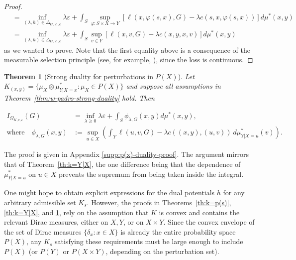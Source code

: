 \documentclass{article}
\newcommand{\Okc}{\Omega_{K, c, \varepsilon}}
\newcommand{\D}{\Delta_{G,\ell, c}}
\newcommand{\phifix}{\phi_{\lambda, G}}
\newtheorem{theorem}{Theorem}[section]
\theoremstyle{definition}
\theoremstyle{remarksty}
\begin{document}
\begin{proof}
\begin{align*}
        & = \inf_{(\lambda, h) \in \D} \lambda \varepsilon  + \int_S   \sup_{\varphi :S\times X  \rightarrow Y} [\ell(x,\varphi(s,x),G) - \lambda c(s,x,\varphi(s,x))] d\mu^*(x,y)\\
        & = \inf_{(\lambda, h) \in \D} \lambda \varepsilon  + \int_S   \sup_{v \in Y} [\ell(x,v,G) - \lambda c(x,y,x,v)] d\mu^*(x,y)
        \end{align*}
    as we wanted to prove. Note that the first equality above is a consequence of the measurable selection principle (see, for example, \cite[Theorem 3A]{rockafellar_integral_1976}), since the loss is continuous.
\end{proof}

\begin{theorem}[Strong duality for perturbations in $P(X)$]\label{th:k=x}
Let $K_{(x,y)} = \{\mu_X \otimes \mu^*_{Y|X = x} : \mu_X \in P(X)\}$ and suppose all assumptions in Theorem~\ref{thm:w-padro-strong-duality} hold. Then

    \begin{align*}
        I_{\Okc} (G) &= \inf_{\lambda \geq 0} \lambda \varepsilon +  \int_{S} \phifix(x,y) d\mu^*(x,y), \\
        \text{where} \quad \phifix (x,y)&:= \sup_{u \in X} \left(\int_Y \ell (u, v, G) - \lambda c((x,y),(u,v))\ d\mu_{Y|X=u}^*(v) \right).
    \end{align*}
\end{theorem}

The proof is given in Appendix \ref{supp:p(x)-duality-proof}. The argument mirrors that of Theorem~\ref{th:k=Y|X}, the one difference being that the dependence of $\mu_{Y|X=u}^*$ on $u\in X$ prevents the supremum from being taken inside the integral.

One might hope to obtain explicit expressions for the dual potentials $h$ for any arbitrary admissible set $K_s$. However, the proofs in Theorems~\ref{th:k=p(s)}, \ref{th:k=Y|X}, and \ref{th:k=x}, rely on the assumption that $K$ is convex and contains the relevant Dirac measures, either on $X, Y$, or on $X\times Y$. Since the convex envelope of the set of Dirac measures $\{\delta_x:x \in X\}$ is already the entire probability space $P(X)$, any $K_s$ satisfying these requirements must be large enough to include $P(X)$ (or $P(Y)$ or $P(X\times Y)$, depending on the perturbation set). 
\end{document}
